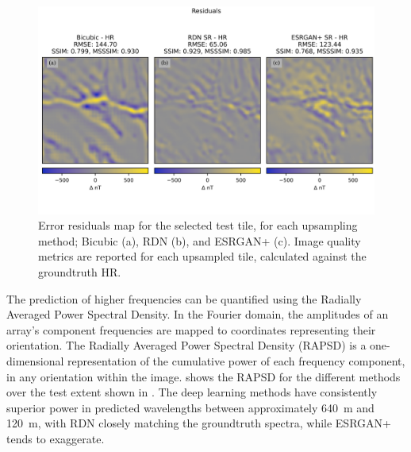\begin{landscape}
    \begin{figure}[hbtp]
        \centering
        \includegraphics[width=\linewidth,trim={0 10mm 0 5mm},clip]{fig/p1/residuals.png}
        \caption[Error residuals map for a selected tile]{Error residuals map for the selected test tile, for each upsampling method; Bicubic (a), RDN\textdaggerdbl{} (b), and ESRGAN+ (c).
            Image quality metrics are reported for each upsampled tile, calculated against the groundtruth HR\@.}
        \label{fig:residuals}
    \end{figure}
\end{landscape}

The prediction of higher frequencies can be quantified using the Radially Averaged Power Spectral Density.
In the Fourier domain, the amplitudes of an array's component frequencies are mapped to coordinates representing their orientation.
The Radially Averaged Power Spectral Density (RAPSD) \parencite{ulichneyDitheringBlueNoise1988} is a one-dimensional representation of the cumulative power of each frequency component, in any orientation within the image.
 shows the RAPSD for the different methods over the test extent shown in . The deep learning methods have consistently superior power in predicted wavelengths between approximately \qty{640}{\metre} and \qty{120}{\metre}, with RDN\textdaggerdbl{} closely matching the groundtruth spectra, while ESRGAN+ tends to exaggerate.


